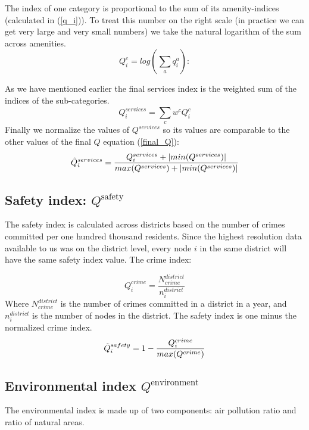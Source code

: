 The index of one category is proportional to the sum of its amenity-indices (calculated in (\ref{q_i})). To treat this number on the right scale (in practice we can get very large and very small numbers) we take the natural logarithm of the sum across amenities.
\begin{equation}
	Q_i^c=log(\sum_a q_i^a):
\end{equation}

As we have mentioned earlier the final services index is the weighted sum of the indices of the sub-categories.
$$Q_i^{services} =\sum_c w^cQ_i^c $$
Finally we normalize the values of $Q^{services}$ so its values are comparable to the other values of the final $Q$ equation (\ref{final_Q}):
\begin{equation}
	\Tilde{Q}_i^{services} =\frac{Q_i^{services}+|min(Q^{services})|}{max(Q^{services})+|min(Q^{services})|}
\end{equation}

\subsection{Safety index: \texorpdfstring{$Q^{\text{safety}}$}{Q\^safety}} \label{safety}

The safety index is calculated across districts based on the number of crimes committed per one hundred thousand residents. Since the highest resolution data available to us was on the district level, every node $i$ in the same district will have the same safety index value. The crime index:

$$Q_i^{crime}=\frac{N^{district}_{crime}}{n_i^{district}}$$
Where $N^{district}_{crime}$ is the number of crimes committed in a district in a year, and $n_i^{district}$ is the number of nodes in the district. The safety index is one minus the normalized crime index.
\begin{equation}
	\Tilde{Q}_i^{safety}=1-\frac{Q_i^{crime}}{max(Q^{crime})}
\end{equation}

\subsection{Environmental index  \texorpdfstring{$Q^{\text{environment}}$}{Q\^environment}} \label{environment}

The environmental index is made up of two components: air pollution ratio and ratio of natural areas.

